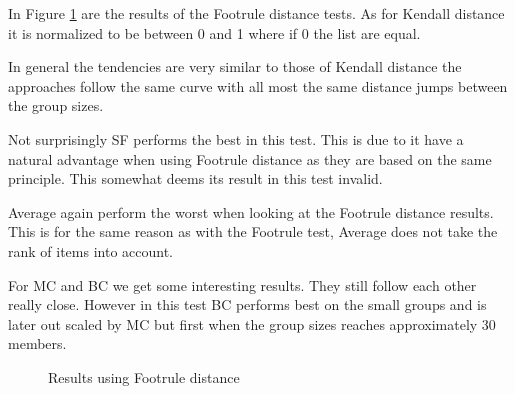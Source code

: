 In Figure \ref{fig:footruledistance} are the results of the Footrule distance tests. As for Kendall distance it is normalized to be between 0 and 1 where if 0 the list are equal. 

In general the tendencies are very similar to those of Kendall distance the approaches follow the same curve with all most the same distance jumps between the group sizes. 

Not surprisingly SF performs the best in this test. This is due to it have a natural advantage when using Footrule distance as they are based on the same principle. This somewhat deems its result in this test invalid. 

Average again perform the worst when looking at the Footrule distance results. This is for the same reason as with the Footrule test, Average does not take the rank of items into account.

For MC and BC we get some interesting results. They still follow each other really close. However in this test BC performs best on the small groups and is later out scaled by MC but first when the group sizes reaches approximately 30 members.

\begin{figure}[H]
\caption{Results using Footrule distance} \label{fig:footruledistance}
\end{figure}
